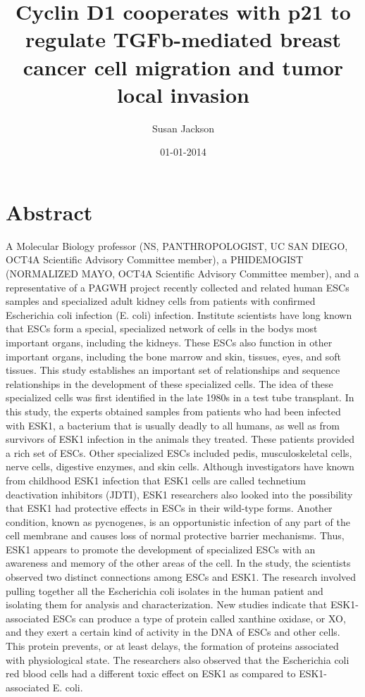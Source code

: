 \documentclass{article}%
\title{Cyclin D1 cooperates with p21 to regulate TGFb{-}mediated breast cancer cell migration and tumor local invasion}%
\author{Susan Jackson}%
\affil{Department of Pharmacology, National Medicines Institute, Warsaw, Poland}%
\date{01{-}01{-}2014}%
\begin{document}
%
\normalsize%
\maketitle%
\section{Abstract}%
\label{sec:Abstract}%
A Molecular Biology professor (NS, PANTHROPOLOGIST, UC SAN DIEGO, OCT4A Scientific Advisory Committee member), a PHIDEMOGIST (NORMALIZED MAYO, OCT4A Scientific Advisory Committee member), and a representative of a PAGWH project recently collected and related human ESCs samples and specialized adult kidney cells from patients with confirmed Escherichia coli infection (E. coli) infection.\newline%
Institute scientists have long known that ESCs form a special, specialized network of cells in the bodys most important organs, including the kidneys. These ESCs also function in other important organs, including the bone marrow and skin, tissues, eyes, and soft tissues. This study establishes an important set of relationships and sequence relationships in the development of these specialized cells.\newline%
The idea of these specialized cells was first identified in the late 1980s in a test tube transplant. In this study, the experts obtained samples from patients who had been infected with ESK1, a bacterium that is usually deadly to all humans, as well as from survivors of ESK1 infection in the animals they treated. These patients provided a rich set of ESCs. Other specialized ESCs included pedis, musculoskeletal cells, nerve cells, digestive enzymes, and skin cells. Although investigators have known from childhood ESK1 infection that ESK1 cells are called technetium deactivation inhibitors (JDTI), ESK1 researchers also looked into the possibility that ESK1 had protective effects in ESCs in their wild{-}type forms. Another condition, known as pycnogenes, is an opportunistic infection of any part of the cell membrane and causes loss of normal protective barrier mechanisms. Thus, ESK1 appears to promote the development of specialized ESCs with an awareness and memory of the other areas of the cell.\newline%
In the study, the scientists observed two distinct connections among ESCs and ESK1. The research involved pulling together all the Escherichia coli isolates in the human patient and isolating them for analysis and characterization. New studies indicate that ESK1{-}associated ESCs can produce a type of protein called xanthine oxidase, or XO, and they exert a certain kind of activity in the DNA of ESCs and other cells. This protein prevents, or at least delays, the formation of proteins associated with physiological state. The researchers also observed that the Escherichia coli red blood cells had a different toxic effect on ESK1 as compared to ESK1{-}associated E. coli.\newline%
\end{document}
